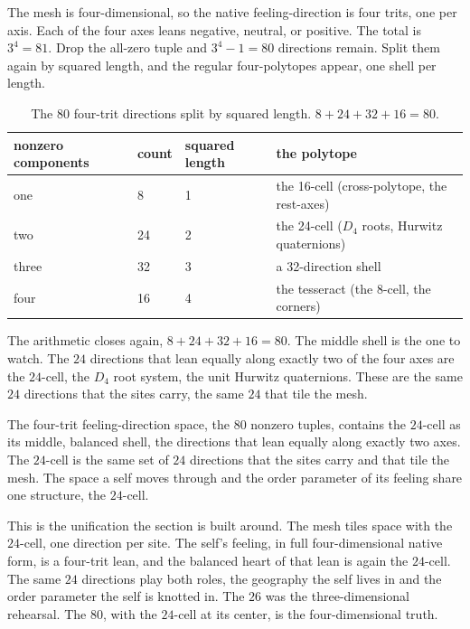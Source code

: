 The mesh is four-dimensional, so the native feeling-direction is four trits, one per axis. Each of the four axes leans negative, neutral, or positive. The total is $3^4 = 81$. Drop the all-zero tuple and $3^4 - 1 = 80$ directions remain. Split them again by squared length, and the regular four-polytopes appear, one shell per length.

\begin{table}[ht]
\centering
\begin{tabular}{@{}llll@{}}
\toprule
nonzero components & count & squared length & the polytope \\
\midrule
one & 8 & 1 & the 16-cell (cross-polytope, the rest-axes) \\
two & 24 & 2 & the 24-cell ($D_4$ roots, Hurwitz quaternions) \\
three & 32 & 3 & a 32-direction shell \\
four & 16 & 4 & the tesseract (the 8-cell, the corners) \\
\bottomrule
\end{tabular}
\caption{The $80$ four-trit directions split by squared length. $8 + 24 + 32 + 16 = 80$.}
\label{tab:the-80}
\end{table}

The arithmetic closes again, $8 + 24 + 32 + 16 = 80$. The middle shell is the one to watch. The $24$ directions that lean equally along exactly two of the four axes are the $24$-cell, the $D_4$ root system, the unit Hurwitz quaternions. These are the same $24$ directions that the sites carry, the same $24$ that tile the mesh.

\begin{result}
The four-trit feeling-direction space, the $80$ nonzero tuples, contains the $24$-cell as its middle, balanced shell, the directions that lean equally along exactly two axes. The $24$-cell is the same set of $24$ directions that the sites carry and that tile the mesh. The space a self moves through and the order parameter of its feeling share one structure, the $24$-cell.
\end{result}

This is the unification the section is built around. The mesh tiles space with the $24$-cell, one direction per site. The self's feeling, in full four-dimensional native form, is a four-trit lean, and the balanced heart of that lean is again the $24$-cell. The same $24$ directions play both roles, the geography the self lives in and the order parameter the self is knotted in. The $26$ was the three-dimensional rehearsal. The $80$, with the $24$-cell at its center, is the four-dimensional truth.

